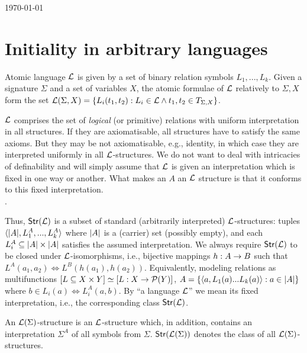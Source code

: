 \documentclass[12pt]{article}
\begin{document}
 

\hfill\today
% 
\section{Initiality in arbitrary languages}
\begin{Definition}
Atomic language ${{\cal{L}}}$ is given by a set of binary relation symbols
$L_1,...,L_k$. Given a signature $\Sigma$ and a set of variables $X$, the
atomic formulae of ${{\cal{L}}}$ relatively to $\Sigma,X$ form the set
${{\cal{L}}}(\Sigma,X)= \{L_i(t_1,t_2): L_i\in {{\cal{L}}}\land t_1,t_2\in T_{\Sigma,X}\}$. 
\end{Definition}
${{\cal{L}}}$ comprises the set of {\em logical} (or primitive) relations with
uniform interpretation in all structures. If they are
axiomatisable, all structures have to satisfy the same axioms. But they may
be not axiomatisable, e.g., identity, in which case they are interpreted
uniformly in all ${{\cal{L}}}$-structures. We do not want to deal with intricacies
of definability and will simply  assume that ${{\cal{L}}}$ is given
an interpretation which is fixed in one way or another. 
What makes an $A$ an ${{\cal{L}}}$ structure is that it conforms to
this fixed interpretation.\\
.  

Thus, ${\sf {Str}}({{\cal{L}}})$ is a subset of standard (arbitrarily interpreted)
${{\cal{L}}}$-structures: tuples  $\langle|A|,L_1^A,...,L_k^A\rangle$ where $|A|$ is a (carrier) set (possibly empty), and each $L_i^A\subseteq|A|\times |A|$
satisfies the assumed interpretation. 
We always require ${\sf {Str}}({{\cal{L}}})$ to be closed under ${{\cal{L}}}$-isomorphisms, i.e.,
bijective mappings $h:A\rightarrow B$ such that $L^A(a_1,a_2) \iff L^B(h(a_1),h(a_2))$.
Equivalently, modeling relations as multifunctions 
$[L\subseteq X\times Y]\mathrel{\simeq} [L:X\rightarrow{\mathcal{P}}(Y)]$,  $A=\{
\langle a,L_1(a)...L_k(a)\rangle:a\in|A|\}$ where $b \in L_i(a) \iff L_i^A(a,b)$.
By ``a language ${{\cal{L}}}$'' we mean its fixed interpretation, i.e., the corresponding class ${\sf {Str}}({{\cal{L}}})$.

An
${{\cal{L}}}(\Sigma)$-structure is an ${{\cal{L}}}$-structure which, in addition, contains
an interpretation $\Sigma^A$ of all symbols from $\Sigma$.
${\sf {Str}}({{\cal{L}}}(\Sigma))$ denotes the class of all ${{\cal{L}}}(\Sigma)$-structures.
\end{document}
